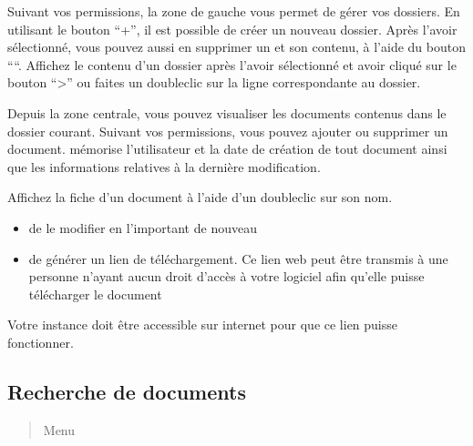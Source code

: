 \documentclass[a4paper,10pt,oneside,french]{sphinxmanual}
\begin{document}
\noindent{}

\sphinxAtStartPar
Suivant vos permissions, la zone de gauche vous permet de gérer vos dossiers.
En utilisant le bouton “+”, il est possible de créer un nouveau dossier.
Après l’avoir sélectionné, vous pouvez aussi en supprimer un et son contenu, à l’aide du bouton “\sphinxhyphen{}“.
Affichez le contenu d’un dossier après l’avoir sélectionné et avoir cliqué sur le bouton “\textgreater{}” ou faites un double\sphinxhyphen{}clic sur la ligne correspondante au dossier.

\sphinxAtStartPar
Depuis la zone centrale, vous pouvez visualiser les documents contenus dans le dossier courant.
Suivant vos permissions, vous pouvez ajouter ou supprimer un document.
 mémorise l’utilisateur et la date de création de tout document ainsi que les informations relatives à la dernière modification.

\sphinxAtStartPar
Affichez la fiche d’un document à l’aide d’un double\sphinxhyphen{}clic sur son nom.

\noindent{}
\begin{description}
\begin{itemize}
\item {} 
\sphinxAtStartPar
de le modifier en l’important de nouveau

\item {} 
\sphinxAtStartPar
de générer un lien de téléchargement. Ce lien web peut être transmis à une personne n’ayant aucun droit d’accès à votre logiciel afin qu’elle puisse télécharger le document

\end{itemize}

\end{description}

\sphinxAtStartPar
{} Votre instance doit être accessible sur internet pour que ce lien puisse fonctionner.


\subsection{Recherche de documents}
\label{\detokenize{documents/shared_document:recherche-de-documents}}\begin{quote}

\sphinxAtStartPar
Menu 
\end{quote}
\end{document}
